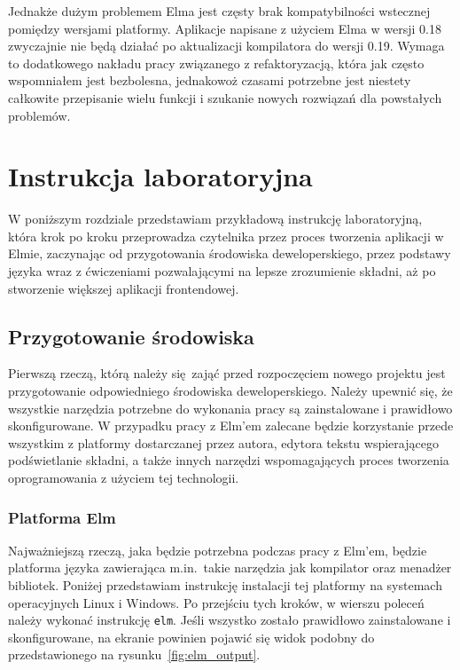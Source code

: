 \documentclass[twoside,a4paper]{report}
\begin{document}
Jednakże dużym problemem Elma jest częsty brak kompatybilności wstecznej pomiędzy wersjami platformy.
Aplikacje napisane z użyciem Elma w wersji 0.18 zwyczajnie nie będą działać po aktualizacji kompilatora do wersji 0.19.
Wymaga to dodatkowego nakładu pracy związanego z refaktoryzacją, która jak często wspomniałem jest bezbolesna, jednakowoż czasami potrzebne jest niestety całkowite przepisanie wielu funkcji i szukanie nowych rozwiązań dla powstałych problemów.


\chapter{Instrukcja laboratoryjna}
W poniższym rozdziale przedstawiam przykładową instrukcję laboratoryjną, która krok po kroku przeprowadza czytelnika przez proces tworzenia aplikacji w Elmie, zaczynając od przygotowania środowiska deweloperskiego, przez podstawy języka wraz z ćwiczeniami pozwalającymi na lepsze zrozumienie składni, aż po stworzenie większej aplikacji frontendowej.

\section{Przygotowanie środowiska}
Pierwszą rzeczą, którą należy się zająć przed rozpoczęciem nowego projektu jest przygotowanie odpowiedniego środowiska deweloperskiego.
Należy upewnić się, że wszystkie narzędzia potrzebne do wykonania pracy są zainstalowane i prawidłowo skonfigurowane.
W przypadku pracy z Elm'em zalecane będzie korzystanie przede wszystkim z platformy dostarczanej przez autora, edytora tekstu wspierającego podświetlanie składni, a także innych narzędzi wspomagających proces tworzenia oprogramowania z użyciem tej technologii.

\subsection{Platforma Elm}
Najważniejszą rzeczą, jaka będzie potrzebna podczas pracy z Elm'em, będzie platforma języka zawierająca m.in.~takie narzędzia jak kompilator oraz menadżer bibliotek.
Poniżej przedstawiam instrukcję instalacji tej platformy na systemach operacyjnych Linux i Windows.
Po przejściu tych kroków, w wierszu poleceń należy wykonać instrukcję \texttt{elm}.
Jeśli wszystko zostało prawidłowo zainstalowane i skonfigurowane, na ekranie powinien pojawić się widok podobny do przedstawionego na rysunku~\ref{fig:elm_output}.
\end{document}
